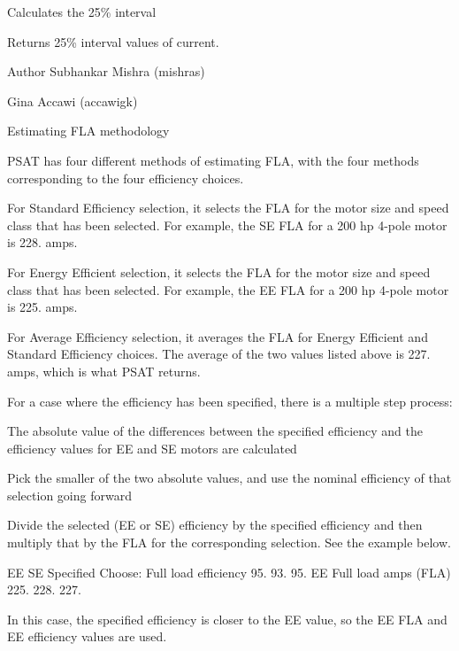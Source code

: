 Calculates the 25\% interval \begin{DoxyReturn}{Returns}
25\% interval values of current.
\end{DoxyReturn}
\begin{DoxyAuthor}{Author}
Subhankar Mishra (mishras) 

Gina Accawi (accawigk) 
\end{DoxyAuthor}
Estimating F\+LA methodology
\begin{DoxyItemize}
\item P\+S\+AT has four different methods of estimating F\+LA, with the four methods corresponding to the four efficiency choices.
\begin{DoxyItemize}
\item For Standard Efficiency selection, it selects the F\+LA for the motor size and speed class that has been selected. For example, the SE F\+LA for a 200 hp 4-\/pole motor is 228. amps.
\item For Energy Efficient selection, it selects the F\+LA for the motor size and speed class that has been selected. For example, the EE F\+LA for a 200 hp 4-\/pole motor is 225. amps.
\item For Average Efficiency selection, it averages the F\+LA for Energy Efficient and Standard Efficiency choices. The average of the two values listed above is 227. amps, which is what P\+S\+AT returns.
\item For a case where the efficiency has been specified, there is a multiple step process\+:
\begin{DoxyEnumerate}
\item The absolute value of the differences between the specified efficiency and the efficiency values for EE and SE motors are calculated
\item Pick the smaller of the two absolute values, and use the nominal efficiency of that selection going forward
\item Divide the selected (EE or SE) efficiency by the specified efficiency and then multiply that by the F\+LA for the corresponding selection. See the example below.
\end{DoxyEnumerate}

EE SE Specified Choose\+: Full load efficiency 95. 93. 95. EE Full load amps (F\+LA) 225. 228. 227.
\end{DoxyItemize}
\end{DoxyItemize}

In this case, the specified efficiency is closer to the EE value, so the EE F\+LA and EE efficiency values are used.

